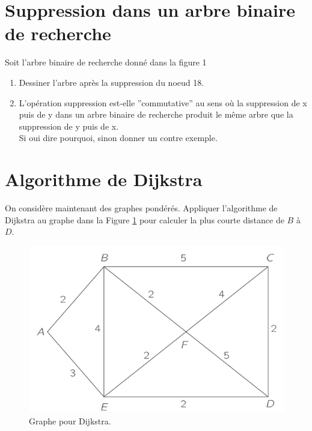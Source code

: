 \documentclass{article}[12pt]
\begin{document}
\section*{Suppression dans un arbre binaire de recherche}
Soit l’arbre binaire de recherche donné dans la figure 1
\begin{enumerate}
    \item Dessiner l’arbre après la suppression du noeud 18.
    \item  L’opération suppression est-elle ”commutative” au sens où la suppression de x puis de y dans un arbre binaire de recherche produit le même arbre que la suppression de y puis
de x.\\
Si oui dire pourquoi, sinon donner un contre exemple.
\end{enumerate}




\section*{Algorithme de Dijkstra}
On considère maintenant des graphes pondérés. Appliquer l'algorithme de Dijkstra au graphe dans la Figure \ref{fig:grapheDijkstra} pour calculer la plus courte distance de $B$ à $D$.

\begin{figure}[h!] 
  \centering
\includegraphics[scale =0.4]{Djikstra.png}
\caption{Graphe pour Dijkstra.} \label{fig:grapheDijkstra}
\end{figure}
\end{document}
